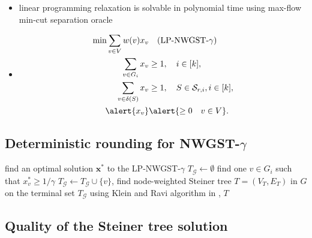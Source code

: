 \documentclass{beamer}
\begin{document}
\begin{frame}{\insertsection}{\insertsubsection}
    \begin{itemize}
        \item linear programming relaxation is solvable in polynomial time using max-flow min-cut separation oracle
        \item[]
        \begin{align*}
            \mbox{min} \sum_{v\in V}w(v)x_v&\quad\mbox{(LP-NWGST-$\gamma$)}\notag\\
            \sum_{v\in G_i} x_v  &\geq 1,  \quad i\in[k],\\
            \sum_{v\in \delta(S)} x_v  &\geq 1, \quad S\in \mathcal{S}_{r,i}, i\in [k],\\
            \alert{x_v} & \alert{\geq 0 \quad v\in V}.
        \end{align*}
    \end{itemize}
\end{frame}

\subsection*{Deterministic rounding for NWGST-$\gamma$}





\begin{frame}{\insertsection}{\insertsubsection}
    \begin{algorithmic}[1]
           \State find an optimal solution $\mathbf{x}^\ast$ to the LP-NWGST-$\gamma$
           \State $T_\mathcal{G}\gets\emptyset$
                \State 	find one $v\in G_i$ such that $x_v^\ast\geq 1/\gamma$
                \State $T_\mathcal{G}\gets T_\mathcal{G}\cup\{v\}$,
           \EndFor
           \State find node-weighted Steiner tree $T=\left(V_T,E_T\right)$ in $G$ on the terminal set $T_\mathcal{G}$ using Klein and Ravi algorithm in \autocite{kleinNearlyBestPossibleApproximation1995},
           \State \Return $T$
        \EndProcedure
        \end{algorithmic}
\end{frame}

\subsection*{Quality of the Steiner tree solution}
\end{document}
